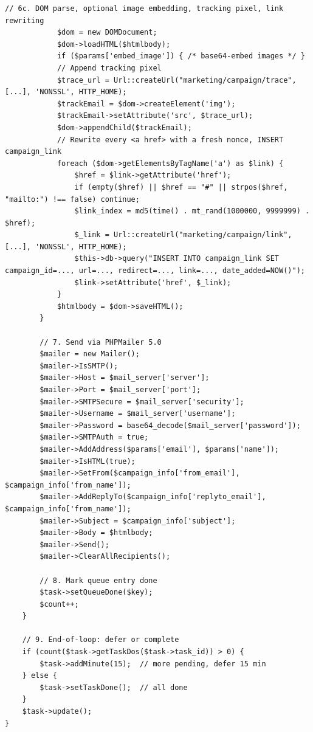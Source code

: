 \documentclass[11pt,a4paper]{article}
\begin{document}
\begin{lstlisting}[caption={\texttt{CronSend::sendCampaign()} --- the campaign sender (abridged).},label={lst:send-campaign}]
            // 6c. DOM parse, optional image embedding, tracking pixel, link rewriting
            $dom = new DOMDocument;
            $dom->loadHTML($htmlbody);
            if ($params['embed_image']) { /* base64-embed images */ }
            // Append tracking pixel
            $trace_url = Url::createUrl("marketing/campaign/trace", [...], 'NONSSL', HTTP_HOME);
            $trackEmail = $dom->createElement('img');
            $trackEmail->setAttribute('src', $trace_url);
            $dom->appendChild($trackEmail);
            // Rewrite every <a href> with a fresh nonce, INSERT campaign_link
            foreach ($dom->getElementsByTagName('a') as $link) {
                $href = $link->getAttribute('href');
                if (empty($href) || $href == "#" || strpos($href, "mailto:") !== false) continue;
                $link_index = md5(time() . mt_rand(1000000, 9999999) . $href);
                $_link = Url::createUrl("marketing/campaign/link", [...], 'NONSSL', HTTP_HOME);
                $this->db->query("INSERT INTO campaign_link SET campaign_id=..., url=..., redirect=..., link=..., date_added=NOW()");
                $link->setAttribute('href', $_link);
            }
            $htmlbody = $dom->saveHTML();
        }

        // 7. Send via PHPMailer 5.0
        $mailer = new Mailer();
        $mailer->IsSMTP();
        $mailer->Host = $mail_server['server'];
        $mailer->Port = $mail_server['port'];
        $mailer->SMTPSecure = $mail_server['security'];
        $mailer->Username = $mail_server['username'];
        $mailer->Password = base64_decode($mail_server['password']);
        $mailer->SMTPAuth = true;
        $mailer->AddAddress($params['email'], $params['name']);
        $mailer->IsHTML(true);
        $mailer->SetFrom($campaign_info['from_email'], $campaign_info['from_name']);
        $mailer->AddReplyTo($campaign_info['replyto_email'], $campaign_info['from_name']);
        $mailer->Subject = $campaign_info['subject'];
        $mailer->Body = $htmlbody;
        $mailer->Send();
        $mailer->ClearAllRecipients();

        // 8. Mark queue entry done
        $task->setQueueDone($key);
        $count++;
    }

    // 9. End-of-loop: defer or complete
    if (count($task->getTaskDos($task->task_id)) > 0) {
        $task->addMinute(15);  // more pending, defer 15 min
    } else {
        $task->setTaskDone();  // all done
    }
    $task->update();
}
\end{lstlisting}
\end{document}
